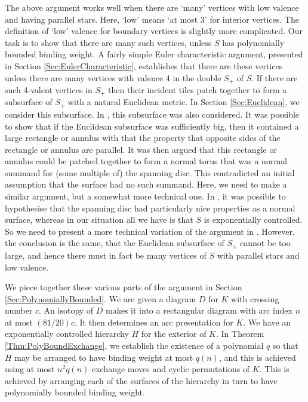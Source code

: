 \documentclass[oneside]{amsart}
\numberwithin{equation}{section}
\theoremstyle{plain}
\theoremstyle{definition}
\begin{document}
The above argument works well when there are `many' vertices with low valence and
having parallel stars. Here, `low' means `at most 3' for interior vertices. The definition of `low' valence for boundary vertices
is slightly more complicated.
Our task is to show that there are many such vertices, unless $S$ has polynomially bounded
binding weight. A fairly simple Euler characteristic argument, presented in Section \ref{Sec:EulerCharacteristic},
establishes that there are these vertices unless there are many vertices with valence 4 in the double $S_+$ of $S$.
If there are such 4-valent vertices in $S_+$ then their incident tiles patch together to form a subsurface of $S_+$
with a natural Euclidean metric. In Section \ref{Sec:Euclidean}, we consider this subsurface.
In \cite{Lackenby:PolyUnknot}, this subsurface was also considered. It was possible to show
that if the Euclidean subsurface was sufficiently big, then it contained a large rectangle or annulus
with that the property that opposite sides of the rectangle or annulus are parallel. It was
then argued that this rectangle or annulus could be patched together to form a normal torus
that was a normal summand for (some multiple of) the spanning disc. This contradicted an initial assumption that
the surface had no such summand. Here, we need to make a similar argument, but a somewhat
more technical one. In \cite{Lackenby:PolyUnknot}, it was possible to hypothesise that the spanning
disc had particularly nice properties as a normal surface, whereas in our situation all we have is that
$S$ is exponentially controlled. So we need to present a more technical variation of the argument in
\cite{Lackenby:PolyUnknot}. However, the conclusion is the same, that the Euclidean subsurface of $S_+$
cannot be too large, and hence there must in fact be many vertices of $S$ with parallel stars and 
low valence. 

We piece together these various parts of the argument in Section \ref{Sec:PolynomiallyBounded}.
We are given a diagram $D$ for $K$ with crossing number $c$. An isotopy of $D$ makes it into
a rectangular diagram with arc index $n$ at most $(81/20)c$. It then determines an arc presentation
for $K$. We have an exponentially controlled hierarchy $H$ for the exterior of $K$. In Theorem \ref{Thm:PolyBoundExchange},
we establish the existence of a polynomial $q$ so that $H$ may be arranged to have binding weight
at most $q(n)$, and this is achieved using at most $n^2 q(n)$ exchange moves and cyclic permutations of $K$.
This is achieved by arranging each of the surfaces of the hierarchy in turn to have polynomially bounded
binding weight.
\end{document}
